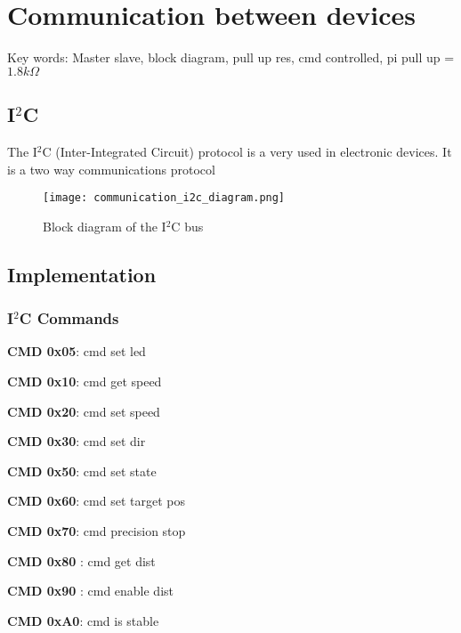 \chapter{Communication between devices}
Key words: Master slave, block diagram, pull up res, cmd controlled,  
pi pull up = $1.8k\Omega$
\section{I$^2$C}

The I$^2$C (Inter-Integrated Circuit) protocol is a very used in electronic devices. It is a two way communications protocol 


\begin{figure}[!ht]
	\centering
	\texttt{[image: communication\_i2c\_diagram.png]}
	\caption{Block diagram of the I$^2$C bus}
	\label{fig:communication_I2C_diagram}
\end{figure}

\section{Implementation}

\subsection{I$^2$C Commands}
\begin{itemize}
	\begin{item}
		\textbf{ CMD 0x05}: cmd set led
	\end{item}

	\begin{item}
		\textbf{ CMD 0x10}: cmd get speed
	\end{item}
	
	\begin{item}
		\textbf{ CMD 0x20}: cmd set speed
	\end{item}	
	
	\begin{item}
		\textbf{ CMD 0x30}: cmd set dir
	\end{item}

	\begin{item}
		\textbf{CMD 0x50}: cmd set state
	\end{item}
	
	\begin{item}
		\textbf{ CMD 0x60}: cmd set target pos
	\end{item}
	
	\begin{item}
		\textbf{CMD 0x70}:  cmd precision stop
	\end{item}

	\begin{item}
		\textbf{CMD 0x80 }: cmd get dist
	\end{item}
	
	\begin{item}
		\textbf{CMD 0x90 }: cmd enable dist
	\end{item}			

	\begin{item}
		\textbf{ CMD 0xA0}: cmd is stable
	\end{item}		

\end{itemize}